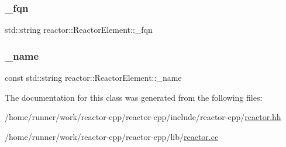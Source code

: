 \mbox{\label{classreactor_1_1ReactorElement_a4c82246281c31e97b3d18c25670f8072}} 
\subsubsection{\texorpdfstring{\+\_\+fqn}{\_fqn}}
{\footnotesize\ttfamily std\+::string reactor\+::\+Reactor\+Element\+::\+\_\+fqn\hspace{0.3cm}{\ttfamily [private]}}

\mbox{\label{classreactor_1_1ReactorElement_a228fa190e96b14e7ea08bb18e7a95ae7}} 
\subsubsection{\texorpdfstring{\+\_\+name}{\_name}}
{\footnotesize\ttfamily const std\+::string reactor\+::\+Reactor\+Element\+::\+\_\+name\hspace{0.3cm}{\ttfamily [private]}}



The documentation for this class was generated from the following files\+:\begin{DoxyCompactItemize}
\item 
/home/runner/work/reactor-\/cpp/reactor-\/cpp/include/reactor-\/cpp/\hyperlink{reactor_8hh}{reactor.\+hh}\item 
/home/runner/work/reactor-\/cpp/reactor-\/cpp/lib/\hyperlink{reactor_8cc}{reactor.\+cc}\end{DoxyCompactItemize}
